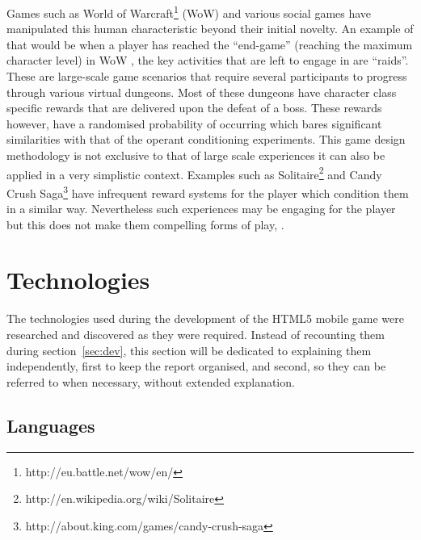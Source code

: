 \documentclass[final]{cmpreport}
\begin{document}
Games such as World of Warcraft\footnote{http://eu.battle.net/wow/en/} (WoW) and various social games have manipulated this human characteristic beyond their initial novelty. An example of that would be when a player has reached the ``end-game'' (reaching the maximum character level) in WoW , the key activities that are left to engage in are ``raids''. These are large-scale game scenarios that require several participants to progress through various virtual dungeons. Most of these dungeons have character class specific rewards that are delivered upon the defeat of a boss. These rewards however, have a randomised probability of occurring which bares significant similarities with that of the operant conditioning experiments. This game design methodology is not exclusive to that of large scale experiences it can also be applied in a very simplistic context. Examples such as Solitaire\footnote{http://en.wikipedia.org/wiki/Solitaire} and Candy Crush Saga\footnote{http://about.king.com/games/candy-crush-saga} have infrequent reward systems for the player which condition them in a similar way. Nevertheless such experiences may be engaging for the player but this does not make them compelling forms of play, \cite{ExtraCredits}.

\section{Technologies}
The technologies used during the development of the HTML5 mobile game were researched and discovered as they were required. Instead of recounting them during section~\ref{sec:dev}, this section will be dedicated to explaining them independently, first to keep the report organised, and second, so they can be referred to when necessary, without extended explanation.

\subsection{Languages}
\end{document}

